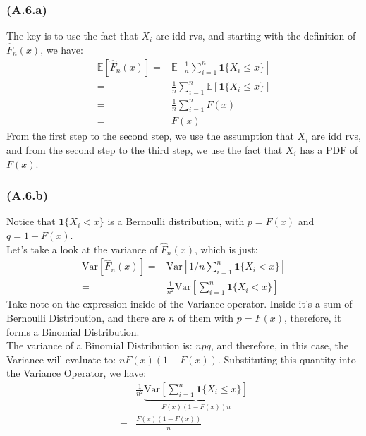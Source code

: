 \documentclass[]{article}
\begin{document}
        \subsubsection*{(A.6.a)}
            The key is to use the fact that $X_i$ are idd rvs, and starting with the definition of $\hat{F}_n(x)$, we have: 
            \begin{align*}\tag{1.6.a.1}\label{eqn:1.6.a.1}
                \mathbb{E}\left[\hat{F}_n(x)
                    \right] =&
                    \mathbb{E}\left[
                        \frac{1}{n}\sum_{i = 1}^{n}\mathbf{1}\{X_i \le x\}
                    \right]
                \\
                =&
                \frac{1}{n}
                    \sum_{i = 1}^{n}
                        \mathbb{E}\left[\mathbf{1}\{X_i\le x\}\right]
                \\
                =& 
                \frac{1}{n} \sum_{i =1}^{n}F(x)
                \\
                =& F(x)
            \end{align*}
            From the first step to the second step, we use the assumption that $X_i$ are idd rvs, and from the second step to the third step, we use the fact that   $X_i$ has a PDF of $F(x)$. 
        \subsubsection*{(A.6.b)}
            Notice that $\mathbf{1}\{X_i < x\}$ is a Bernoulli distribution, with $p = F(x)$ and $q = 1 - F(x)$. 
            \\
            Let's take a look at the variance of $\hat{F}_n(x)$, which is just: 
            \begin{align*}\tag{1.6.b.1}\label{eqn:1.6.b.1}
                \text{Var}\left[\hat{F}_n(x)\right]
                =& 
                \text{Var}\left[1/n
                    \sum_{i = 1}^{n}
                        \mathbf{1}\{X_i < x\}
                \right] 
                \\
                =&
                \frac{1}{n^2}\text{Var}\left[
                    \sum_{i = 1}^{n}\mathbf{1}\{X_i < x\}
                \right]
            \end{align*}
            Take note on the expression inside of the Variance operator. Inside it's a sum of Bernoulli Distribution, and there are $n$ of them with $p = F(x)$, therefore, it forms a Binomial Distribution. 
            \\
            The variance of a Binomial Distribution is: $npq$, and therefore, in this case, the Variance will evaluate to: $nF(x)(1 - F(x))$. Substituting this quantity into the Variance Operator, we have: 
            \begin{align*}\tag{1.6.b.1}\label{eqn:1.6.b.1}
                & \frac{1}{n^2}
                \underbrace{
                \text{Var}\left[
                    \sum_{i = 1}^{n}\mathbf{1}\{X_i \le x\}
                \right]}_{F(x)(1 - F(x))n}
                \\
                =& 
                \frac{F(x)(1 - F(x))}{n}
            \end{align*}
\end{document}

